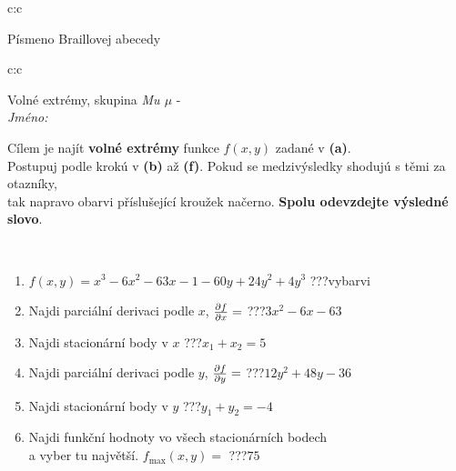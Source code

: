 \documentclass[10pt]{report}
\begin{document}
\begin{tabular}{c:c}
\begin{minipage}[c][104.5mm][t]{0.5\linewidth}
\begin{center}
\begin{minipage}{0.20\linewidth}
\begin{center}
{\small Písmeno Braillovej abecedy}
\end{center}
\end{minipage}
\end{center}
\end{minipage}
%
\end{tabular}
\newpage
\thispagestyle{empty}
\begin{tabular}{c:c}
\begin{minipage}[c][104.5mm][t]{0.5\linewidth}
\begin{center}
\vspace{7mm}
{\huge Volné extrémy, skupina \textit{Mu $\mu$} -}\\[5mm]
\textit{Jméno:}\phantom{xxxxxxxxxxxxxxxxxxxxxxxxxxxxxxxxxxxxxxxxxxxxxxxxxxxxxxxxxxxxxxxxx}\\[5mm]
\begin{minipage}{0.95\linewidth}
\begin{center}
Cílem je najít \textbf{volné extrémy} funkce $f(x,y)$ zadané v \textbf{(a)}.\\Postupuj podle krokú v \textbf{(b)} až \textbf{(f)}. Pokud se medzivýsledky shodujú s těmi za otazníky,\\tak napravo obarvi příslušející kroužek načerno. \textbf{Spolu odevzdejte výsledné slovo}.
\end{center}
\end{minipage}
\\[1mm]
\begin{minipage}{0.79\linewidth}
\begin{center}
\begin{varwidth}{\linewidth}
\begin{enumerate}
\normalsize
\item $f(x,y)=x^3-6x^2-63x-1-60y+24y^2+4y^3$\quad \dotfill\; ???\;\dotfill \quad vybarvi
\item Najdi parciální derivaci podle $x$, $\pdv{f}{x}=$\quad \dotfill\; ???\;\dotfill \quad $3x^2-6x-63$
\item Najdi stacionární body v $x$\quad \dotfill\; ???\;\dotfill \quad $x_1+x_2=5$
\item Najdi parciální derivaci podle $y$, $\pdv{f}{y}=$\quad \dotfill\; ???\;\dotfill \quad $12y^2+48y-36$
\item Najdi stacionární body v $y$\quad \dotfill\; ???\;\dotfill \quad $y_1+y_2=-4$
\item Najdi funkční hodnoty vo všech stacionárních bodech \\ \phantom{xxxxxx} a vyber tu najvětší. $f_{\text{max}}(x,y)=$\quad \dotfill\; ???\;\dotfill \quad $75$

\end{enumerate}
\end{varwidth}
\end{center}
\end{minipage}
\end{center}
\end{minipage}
\end{tabular}
\end{document}
